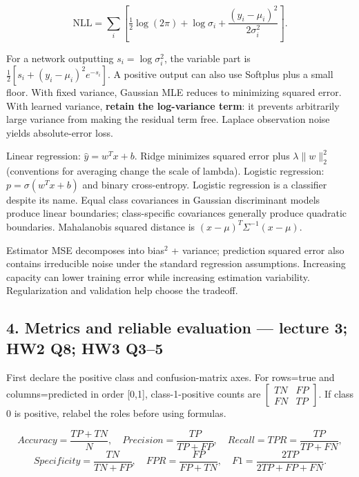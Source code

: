 \documentclass[11pt]{article}
\begin{document}
\[
\mathrm{NLL}=\sum_i\left[\tfrac12\log(2\pi)+\log\sigma_i+\frac{(y_i-\mu_i)^2}{2\sigma_i^2}\right].
\]

For a network outputting $s_i=\log\sigma_i^2$, the variable part is $\frac12[s_i+(y_i-\mu_i)^2e^{-s_i}]$. A positive output can also use Softplus plus a small floor. With fixed variance, Gaussian MLE reduces to minimizing squared error. With learned variance, \textbf{retain the log-variance term}: it prevents arbitrarily large variance from making the residual term free. Laplace observation noise yields absolute-error loss.

Linear regression: $\hat y=w^Tx+b$. Ridge minimizes squared error plus $\lambda\|w\|_2^2$ (conventions for averaging change the scale of lambda). Logistic regression: $p=\sigma(w^Tx+b)$ and binary cross-entropy. Logistic regression is a classifier despite its name. Equal class covariances in Gaussian discriminant models produce linear boundaries; class-specific covariances generally produce quadratic boundaries. Mahalanobis squared distance is $(x-\mu)^T\Sigma^{-1}(x-\mu)$.

Estimator MSE decomposes into bias\ensuremath{{}^2} + variance; prediction squared error also contains irreducible noise under the standard regression assumptions. Increasing capacity can lower training error while increasing estimation variability. Regularization and validation help choose the tradeoff.

\subsection*{4. Metrics and reliable evaluation — lecture 3; HW2 Q8; HW3 Q3–5}

First declare the positive class and confusion-matrix axes. For rows=true and columns=predicted in order [0,1], class-1-positive counts are $\begin{bmatrix}TN&FP\\FN&TP\end{bmatrix}$. If class 0 is positive, relabel the roles before using formulas.

\[
Accuracy=\frac{TP+TN}{N},\quad Precision=\frac{TP}{TP+FP},\quad Recall=TPR=\frac{TP}{TP+FN},
\]
\[
Specificity=\frac{TN}{TN+FP},\quad FPR=\frac{FP}{FP+TN},\quad F1=\frac{2TP}{2TP+FP+FN}.
\]
\end{document}
